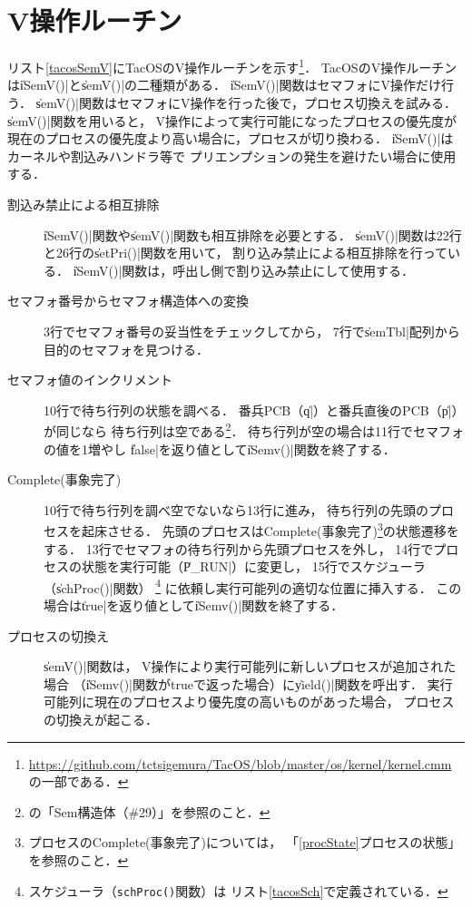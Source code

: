 \section{V操作ルーチン}
リスト\ref{tacosSemV}にTacOSのV操作ルーチンを示す\footnote{
  \url{https://github.com/tctsigemura/TacOS/blob/master/os/kernel/kernel.cmm}
  の一部である．}．
TacOSのV操作ルーチンは\|iSemV()|と\|semV()|の二種類がある．
\|iSemV()|関数はセマフォにV操作だけ行う．
\|semV()|関数はセマフォにV操作を行った後で，プロセス切換えを試みる．
\|semV()|関数を用いると，
V操作によって実行可能になったプロセスの優先度が
現在のプロセスの優先度より高い場合に，プロセスが切り換わる．
\|iSemV()|はカーネルや割込みハンドラ等で
プリエンプションの発生を避けたい場合に使用する．



\begin{description}
\item [割込み禁止による相互排除]
  \|iSemV()|関数や\|semV()|関数も相互排除を必要とする．
  \|semV()|関数は22行と26行の\|setPri()|関数を用いて，
  割り込み禁止による相互排除を行っている．
  \|iSemV()|関数は，呼出し側で割り込み禁止にして使用する．
\item [セマフォ番号からセマフォ構造体への変換]
  3行でセマフォ番号の妥当性をチェックしてから，
  7行で\|semTbl|配列から目的のセマフォを見つける．
\item [セマフォ値のインクリメント]
  10行で待ち行列の状態を調べる．
  番兵PCB（\|q|）と番兵直後のPCB（\|p|）が同じなら
  待ち行列は空である\footnote{
    の「Sem構造体（\#29）」を参照のこと．}．
  待ち行列が空の場合は11行でセマフォの値を1増やし
  \|false|を返り値として\|iSemv()|関数を終了する．
\item [Complete(事象完了)]
  10行で待ち行列を調べ空でないなら13行に進み，
  待ち行列の先頭のプロセスを起床させる．
  先頭のプロセスはComplete(事象完了)\footnote{
    プロセスのComplete(事象完了)については，
    「\ref{procState}プロセスの状態」を参照のこと．}の状態遷移をする．
  13行でセマフォの待ち行列から先頭プロセスを外し，
  14行でプロセスの状態を実行可能（\|P_RUN|）に変更し，
  15行でスケジューラ（\|schProc()|関数）
  \footnote{
    スケジューラ（\texttt{schProc()}関数）は
    リスト\ref{tacosSch}で定義されている．}
  に依頼し実行可能列の適切な位置に挿入する．
  この場合は\|true|を返り値として\|iSemv()|関数を終了する．
\item [プロセスの切換え]
  \|semV()|関数は，
  V操作により実行可能列に新しいプロセスが追加された場合
  （\|iSemv()|関数がtrueで返った場合）に\|yield()|関数を呼出す．
  実行可能列に現在のプロセスより優先度の高いものがあった場合，
  プロセスの切換えが起こる．
\end{description}

